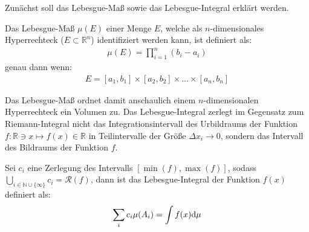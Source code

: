 Zunächst soll das Lebesgue-Maß sowie das Lebesgue-Integral erklärt werden. 
\begin{Definition}
    Das Lebesgue-Maß $\mu(E)$ einer Menge $E$, welche als $n$-dimensionales Hyperrechteck ($E\subset \mathbb{R}^n$) identifiziert werden kann, ist definiert als:
    \begin{align*}
        \mu(E)= \prod_{i=1}^{n}{(b_i - a_i)}
    \end{align*}
    genau dann wenn:
    \begin{align*}
        E=[a_1 , b_1] \times [a_2 , b_2] \times \ldots \times [a_n , b_n]
    \end{align*}
\end{Definition}
Das Lebesgue-Maß ordnet damit anschaulich einem $n$-dimensionalen Hyperrechteck ein Volumen zu.
Das Lebesgue-Integral zerlegt im Gegensatz zum Riemann-Integral nicht das Integrationsintervall des Urbildraums der Funktion $f:\mathbb{R} \ni x \mapsto f(x)\in \mathbb{R}$ in Teilintervalle der Größe $\Delta x_i \to 0$, sondern das Intervall des Bildraums der Funktion $f$.
\begin{Definition}
    Sei $c_i$ eine Zerlegung des Intervalls $[\min(f),\max(f)]$, sodass $\bigcup_{i\in \mathbb{N}\cup \{\infty\}}c_i = \mathscr{R}(f)$, dann ist das Lebesgue-Integral der Funktion $f(x)$ definiert als:
    \begin{align*}
        \sum_{i}{c_i \mu(A_i)} = \int{f(x) \text{d}{\mu}}
    \end{align*}
\end{Definition}